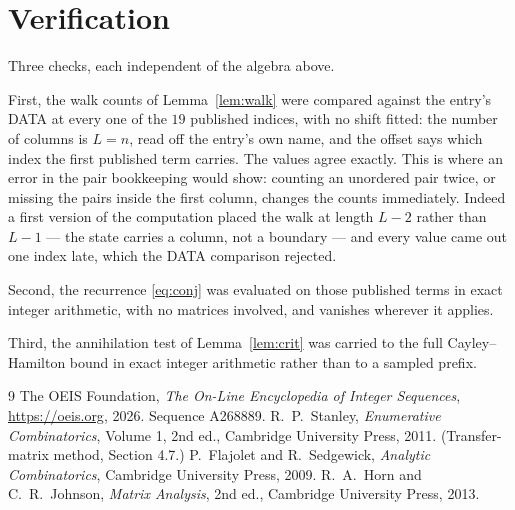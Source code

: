\documentclass[11pt,a4paper]{article}
\theoremstyle{plain}
\theoremstyle{definition}
\begin{document}
\section{Verification}

Three checks, each independent of the algebra above.

First, the walk counts of Lemma~\ref{lem:walk} were compared against the entry's DATA at
every one of the $19$ published indices, with no shift fitted: the number of columns is
$L=n$, read off the entry's own name, and the offset says which index the first
published term carries. The values agree exactly. This is where an error in the pair
bookkeeping would show: counting an unordered pair twice, or missing the pairs inside the
first column, changes the counts immediately. Indeed a first version of the computation
placed the walk at length $L-2$ rather than $L-1$ --- the state carries a column, not a
boundary --- and every value came out one index late, which the DATA comparison rejected.

Second, the recurrence \eqref{eq:conj} was evaluated on those published terms in exact
integer arithmetic, with no matrices involved, and vanishes wherever it applies.

Third, the annihilation test of Lemma~\ref{lem:crit} was carried to the full
Cayley--Hamilton bound in exact integer arithmetic rather than to a sampled prefix.

\begin{thebibliography}{9}
 The OEIS Foundation, \emph{The On-Line Encyclopedia of Integer
Sequences}, \url{https://oeis.org}, 2026. Sequence A268889.
 R.~P.~Stanley, \emph{Enumerative Combinatorics}, Volume 1, 2nd ed.,
Cambridge University Press, 2011. (Transfer-matrix method, Section 4.7.)
 P.~Flajolet and R.~Sedgewick, \emph{Analytic Combinatorics}, Cambridge
University Press, 2009.
 R.~A.~Horn and C.~R.~Johnson, \emph{Matrix Analysis}, 2nd ed., Cambridge
University Press, 2013.
\end{thebibliography}
\end{document}
